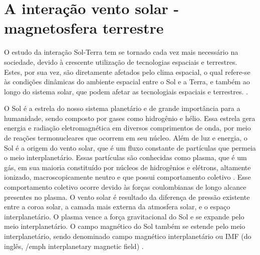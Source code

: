 \saythanks

\normalsize
\baselineskip=12pt %


\section{A interação vento solar - magnetosfera terrestre}

O estudo da interação Sol-Terra tem se tornado cada vez mais necessário na sociedade, devido à crescente utilização de tecnologias espaciais e terrestres. Estes, por sua vez, são diretamente afetados pelo clima espacial, o qual refere-se às condições dinâmicas do ambiente espacial entre o Sol e a Terra, e também ao longo do sistema solar, que podem afetar as tecnologiais espaciais e terrestres.  \cite{gombosi2004,russell2001,oliveira2016,nstc2015}.

O Sol é a estrela do nosso sistema planetário e de grande importância para a humanidade, sendo composto por gases como hidrogênio e hélio. Essa estrela gera energia e radiação eletromagnética em diversos comprimentos de onda, por meio de reações termonucleares que ocorrem em seu núcleo. Além de luz e energia, o Sol é a origem do vento solar, que é um fluxo constante de partículas que permeia o meio interplanetário. Essas partículas são conhecidas como plasma, que é um gás, em sua maioria constituído por núcleos de hidrogênios e elétrons, altamente ionizado, macroscopicamente neutro e que possui comportamento coletivo \cite{baumjohann1996,bittencourt}. Esse comportamento coletivo ocorre devido às forças coulombianas de longo alcance presentes no plasma. O vento solar é resultado da diferença de pressão existente entre a coroa solar, a camada mais externa da atmosfera solar, e o espaço interplanetário. O plasma vence a força gravitacional do Sol e se expande pelo meio interplanetário. O campo magnético do Sol também se estende pelo meio interplanetário, sendo denominado campo magnético interplanetário ou IMF (do inglês, {/emph interplanetary magnetic field}) \cite{costa2011, kivelson1995}. 

